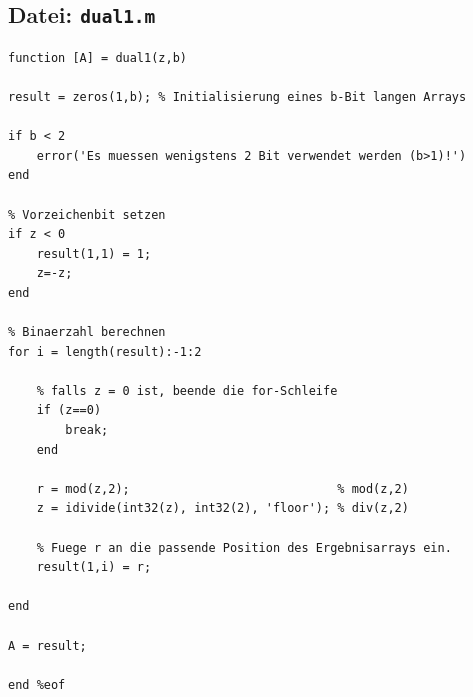 \documentclass{llncs}
\begin{document}
\subsection*{Datei: \texttt{dual1.m}}
\begin{verbatim}
function [A] = dual1(z,b)

result = zeros(1,b); % Initialisierung eines b-Bit langen Arrays

if b < 2
    error('Es muessen wenigstens 2 Bit verwendet werden (b>1)!')
end

% Vorzeichenbit setzen
if z < 0
    result(1,1) = 1;
    z=-z;
end

% Binaerzahl berechnen
for i = length(result):-1:2

    % falls z = 0 ist, beende die for-Schleife
    if (z==0)
        break;
    end
    
    r = mod(z,2);                             % mod(z,2)
    z = idivide(int32(z), int32(2), 'floor'); % div(z,2)
    
    % Fuege r an die passende Position des Ergebnisarrays ein.
    result(1,i) = r; 
 
end

A = result;

end %eof
\end{verbatim}
\newpage
\end{document}
